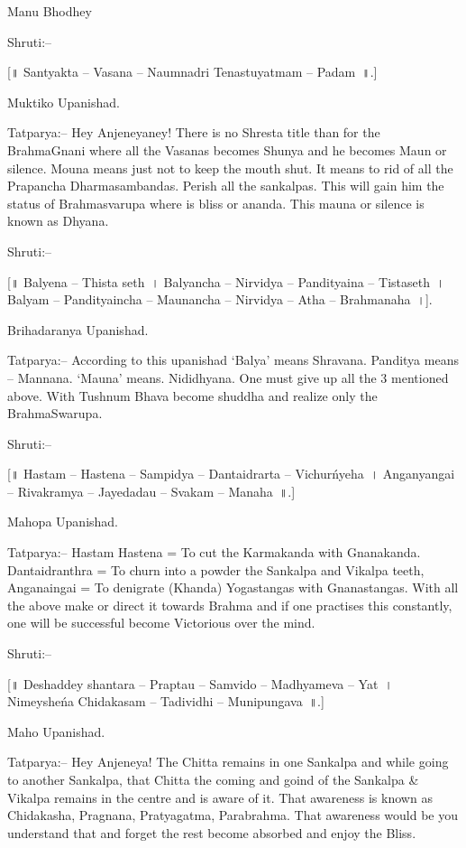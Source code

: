 Manu Bhodhey

Shruti:–

[॥ Santyakta – Vasana – Naumnadri Tenastuyatmam – Padam~॥.]

Muktiko Upanishad.

Tatparya:– Hey Anjeneyaney! There is no Shresta title than for the BrahmaGnani where all the Vasanas becomes Shunya and he becomes Maun or silence. Mouna means just not to keep the mouth shut. It means to rid of all the Prapancha Dharmasambandas. Perish all the sankalpas. This will gain him the status of Brahmasvarupa where is bliss or ananda. This mauna or silence is known as Dhyana.

Shruti:–

[॥ Balyena – Thista seth~। Balyancha – Nirvidya – Pandityaina – Tistaseth~। Balyam – Pandityaincha – Maunancha – Nirvidya – Atha – Brahmanaha~।].

Brihadaranya Upanishad.

Tatparya:– According to this upanishad ‘Balya’ means Shravana. Panditya means – Mannana. ‘Mauna’ means. Nididhyana. One must give up all the 3 mentioned above. With Tushnum Bhava become shuddha and realize only the BrahmaSwarupa.

Shruti:–

[॥ Hastam – Hastena – Sampidya – Dantaidrarta – Vichurńyeha~। Anganyangai – Rivakramya – Jayedadau – Svakam – Manaha~॥.]

Mahopa Upanishad.

Tatparya:– Hastam Hastena = To cut the Karmakanda with Gnanakanda. Dantaidranthra = To churn into a powder the Sankalpa and Vikalpa teeth, Anganaingai = To denigrate (Khanda) Yogastangas with Gnanastangas. With all the above make or direct it towards Brahma and if one practises this constantly, one will be successful become Victorious over the mind.

Shruti:–

[॥ Deshaddey shantara – Praptau – Samvido – Madhyameva – Yat~। Nimeysheńa Chidakasam – Tadividhi – Munipungava~॥.]

Maho Upanishad.

Tatparya:– Hey Anjeneya! The Chitta remains in one Sankalpa and while going to another Sankalpa, that Chitta the coming and goind of the Sankalpa \& Vikalpa remains in the centre and is aware of it. That awareness is known as Chidakasha, Pragnana, Pratyagatma, Parabrahma. That awareness would be you understand that and forget the rest become absorbed and enjoy the Bliss.


